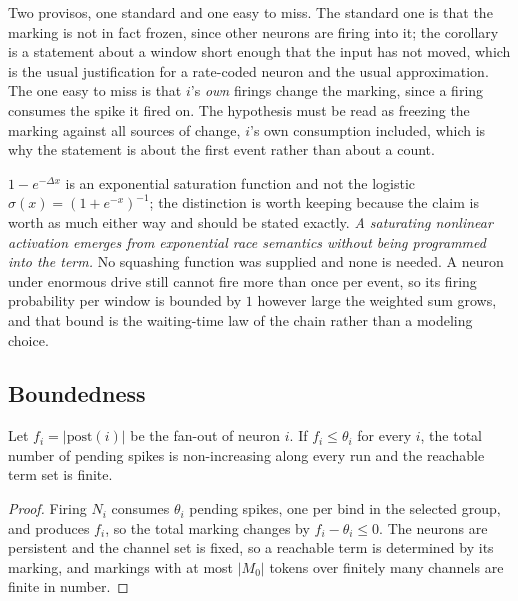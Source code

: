 Two provisos, one standard and one easy to miss. The standard one is that the marking is
not in fact frozen, since other neurons are firing into it; the corollary is a statement
about a window short enough that the input has not moved, which is the usual
justification for a rate-coded neuron and the usual approximation. The one easy to miss
is that $i$'s \emph{own} firings change the marking, since a firing consumes the spike it
fired on. The hypothesis must be read as freezing the marking against all sources of
change, $i$'s own consumption included, which is why the statement is about the first
event rather than about a count.

\begin{remark}
\label{spk:rmk:notlogistic}
$1 - e^{-\Delta x}$ is an exponential saturation function and not the logistic
$\sigma(x) = (1+e^{-x})^{-1}$; the distinction is worth keeping because the claim is
worth as much either way and should be stated exactly. \emph{A saturating nonlinear
activation emerges from exponential race semantics without being programmed into the
term.} No squashing function was supplied and none is needed. A neuron under enormous
drive still cannot fire more than once per event, so its firing probability per window is
bounded by $1$ however large the weighted sum grows, and that bound is the waiting-time
law of the chain rather than a modeling choice.
\end{remark}

\subsection{Boundedness}

\begin{lemma}[Boundedness]
\label{spk:lem:bounded}
Let $f_i = |\mathrm{post}(i)|$ be the fan-out of neuron $i$. If $f_i \leq \theta_i$ for
every $i$, the total number of pending spikes is non-increasing along every run and the
reachable term set is finite.
\end{lemma}

\begin{proof}
Firing $N_i$ consumes $\theta_i$ pending spikes, one per bind in the selected group, and
produces $f_i$, so the total marking changes by $f_i - \theta_i \leq 0$. The neurons are
persistent and the channel set is fixed, so a reachable term is determined by its
marking, and markings with at most $|M_0|$ tokens over finitely many channels are finite
in number.
\end{proof}

